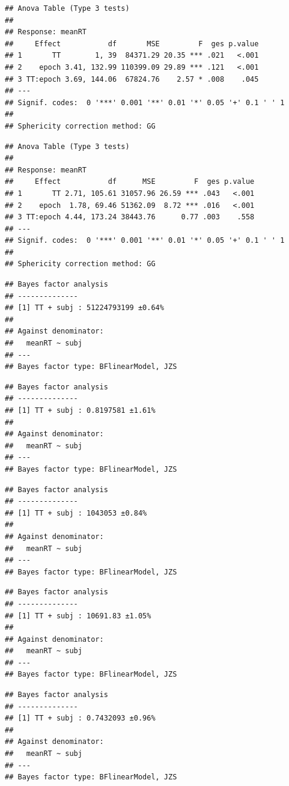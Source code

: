 \documentclass[
  man]{apa6}
\begin{document}
\begin{verbatim}
## Anova Table (Type 3 tests)
## 
## Response: meanRT
##     Effect           df       MSE         F  ges p.value
## 1       TT        1, 39  84371.29 20.35 *** .021   <.001
## 2    epoch 3.41, 132.99 110399.09 29.89 *** .121   <.001
## 3 TT:epoch 3.69, 144.06  67824.76    2.57 * .008    .045
## ---
## Signif. codes:  0 '***' 0.001 '**' 0.01 '*' 0.05 '+' 0.1 ' ' 1
## 
## Sphericity correction method: GG
\end{verbatim}

\begin{verbatim}
## Anova Table (Type 3 tests)
## 
## Response: meanRT
##     Effect           df      MSE         F  ges p.value
## 1       TT 2.71, 105.61 31057.96 26.59 *** .043   <.001
## 2    epoch  1.78, 69.46 51362.09  8.72 *** .016   <.001
## 3 TT:epoch 4.44, 173.24 38443.76      0.77 .003    .558
## ---
## Signif. codes:  0 '***' 0.001 '**' 0.01 '*' 0.05 '+' 0.1 ' ' 1
## 
## Sphericity correction method: GG
\end{verbatim}

\begin{verbatim}
## Bayes factor analysis
## --------------
## [1] TT + subj : 51224793199 ±0.64%
## 
## Against denominator:
##   meanRT ~ subj 
## ---
## Bayes factor type: BFlinearModel, JZS
\end{verbatim}

\begin{verbatim}
## Bayes factor analysis
## --------------
## [1] TT + subj : 0.8197581 ±1.61%
## 
## Against denominator:
##   meanRT ~ subj 
## ---
## Bayes factor type: BFlinearModel, JZS
\end{verbatim}

\begin{verbatim}
## Bayes factor analysis
## --------------
## [1] TT + subj : 1043053 ±0.84%
## 
## Against denominator:
##   meanRT ~ subj 
## ---
## Bayes factor type: BFlinearModel, JZS
\end{verbatim}

\begin{verbatim}
## Bayes factor analysis
## --------------
## [1] TT + subj : 10691.83 ±1.05%
## 
## Against denominator:
##   meanRT ~ subj 
## ---
## Bayes factor type: BFlinearModel, JZS
\end{verbatim}

\begin{verbatim}
## Bayes factor analysis
## --------------
## [1] TT + subj : 0.7432093 ±0.96%
## 
## Against denominator:
##   meanRT ~ subj 
## ---
## Bayes factor type: BFlinearModel, JZS
\end{verbatim}
\end{document}

